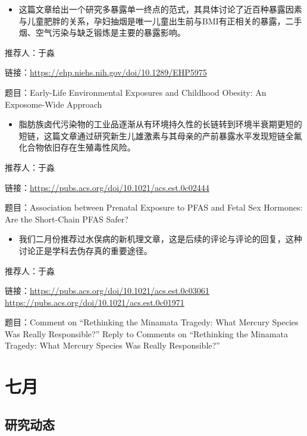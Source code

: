 \documentclass[]{book}
\providecommand{\tightlist}{%
  \setlength{\itemsep}{0pt}\setlength{\parskip}{0pt}}
\begin{document}
\begin{itemize}
\tightlist
\item
  这篇文章给出一个研究多暴露单一终点的范式，其具体讨论了近百种暴露因素与儿童肥胖的关系，孕妇抽烟是唯一儿童出生前与BMI有正相关的暴露，二手烟、空气污染与缺乏锻炼是主要的暴露影响。
\end{itemize}

推荐人：于淼

链接：\url{https://ehp.niehs.nih.gov/doi/10.1289/EHP5975}

题目：Early-Life Environmental Exposures and Childhood Obesity: An Exposome-Wide Approach

\begin{itemize}
\tightlist
\item
  脂肪族卤代污染物的工业品逐渐从有环境持久性的长链转到环境半衰期更短的短链，这篇文章通过研究新生儿雄激素与其母亲的产前暴露水平发现短链全氟化合物依旧存在生殖毒性风险。
\end{itemize}

推荐人：于淼

链接：\url{https://pubs.acs.org/doi/10.1021/acs.est.0c02444}

题目：Association between Prenatal Exposure to PFAS and Fetal Sex Hormones: Are the Short-Chain PFAS Safer?

\begin{itemize}
\tightlist
\item
  我们二月份推荐过水俣病的新机理文章，这是后续的评论与评论的回复，这种讨论正是学科去伪存真的重要途径。
\end{itemize}

推荐人：于淼

链接：\url{https://pubs.acs.org/doi/10.1021/acs.est.0c03061} \url{https://pubs.acs.org/doi/10.1021/acs.est.0c01971}

题目：Comment on ``Rethinking the Minamata Tragedy: What Mercury Species Was Really Responsible?'' Reply to Comments on ``Rethinking the Minamata Tragedy: What Mercury Species Was Really Responsible?''

\hypertarget{ux4e03ux6708-2}{%
\section*{七月}\label{ux4e03ux6708-2}}

\hypertarget{ux7814ux7a76ux52a8ux6001-32}{%
\subsection*{研究动态}\label{ux7814ux7a76ux52a8ux6001-32}}
\end{document}
